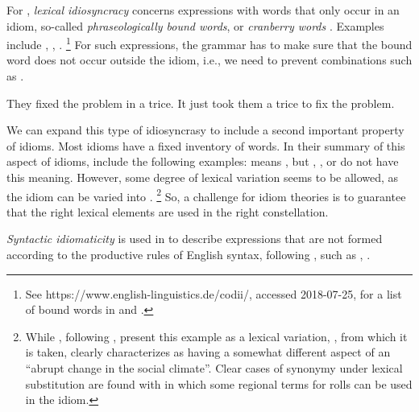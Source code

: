 \documentclass[output=paper]{langsci/langscibook}
\begin{document}
\medskip%
For \cite{Baldwin:Kim:10}, \emph{lexical idiosyncracy} concerns expressions with words that only occur in an idiom, so-called \emph{phraseologically bound words}, or \emph{cranberry words} \citep{Aronoff76a-u}. Examples include , , .%
\footnote{See https://www.english-linguistics.de/codii/, accessed 2018-07-25, for a list of bound words in  and  \citep{Trawinski:al:08lrec}.}
For such expressions, the grammar has to make sure that the bound word does not occur outside the idiom, i.e., we need to prevent combinations such as .

\eal \label{trice}
\ex  They fixed the problem in a trice.
\ex *It just took them a trice to fix the problem.\label{trice-ko}
\zl 

We can expand this type of idiosyncrasy to include  a second important property of idioms. 
Most idioms have a fixed inventory of words. In their summary of this aspect of idioms, \cite[--828]{Gibbs:Colston:07} include the following examples:  means , but , , or  do not have this meaning. However, some degree of lexical variation seems to be allowed, as
the idiom  can be varied into .%
\footnote{\label{fn-semmeln}While \cite{Gibbs:Colston:07}, following \cite{Gibbs:al:89}, present this example as a lexical variation, \cite[]{Glucksberg:01}, from which it is taken, clearly characterizes as having a somewhat different aspect of an ``abrupt change in the social climate''. Clear cases of synonymy under lexical substitution are found with   in which some regional terms for rolls can be used in  the idiom.}
 So, a challenge for idiom theories is to guarantee that the 
right lexical elements are used in the right constellation.


\medskip%
\emph{Syntactic idiomaticity} is used in \cite{Baldwin:Kim:10} to describe expressions that are not formed according to the productive rules of English syntax, following \cite{FKoC88a}, such as , .  
\end{document}
